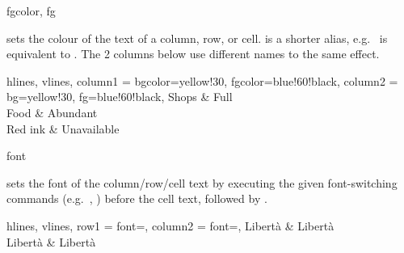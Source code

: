 \begin{codedescribe}[
    key,
    new=2021K,
    update=2021L,
    update=2021P,
    update=2026A
  ]{fgcolor, fg}
  \begin{codesyntax}
  \end{codesyntax}
   sets the colour of the text of a column, row, or cell.  is a shorter alias, e.g.\  is equivalent to . The 2 columns below use different names to the same effect.

  \begin{codestore}[st=columns:bgfgcolor]
    \begin{tblr}{
        hlines, vlines,
        column{1} = {bgcolor=yellow!30, fgcolor=blue!60!black},
        column{2} = {bg=yellow!30, fg=blue!60!black},
      }
      Shops   & Full        \\
      Food    & Abundant    \\
      Red ink & Unavailable
    \end{tblr}\end{codestore}
  \begin{center}
  \end{center}
\end{codedescribe}

\begin{codedescribe}[
    key,
    new=2021K,
    update=2021L
  ]{font}
  \begin{codesyntax}
  \end{codesyntax}
   sets the font of the column/row/cell text by executing the given font-switching commands (e.g.\ , ) before the cell text, followed by .

  \begin{codestore}[st=columns:font]
    \begin{tblr}{
        hlines, vlines,
        row{1} = {font=\bfseries},
        column{2} = {font=\itshape\Large},
      }
      Libertà & Libertà \\
      Libertà & Libertà
    \end{tblr}\end{codestore}
  \begin{center}
  \end{center}
\end{codedescribe}

